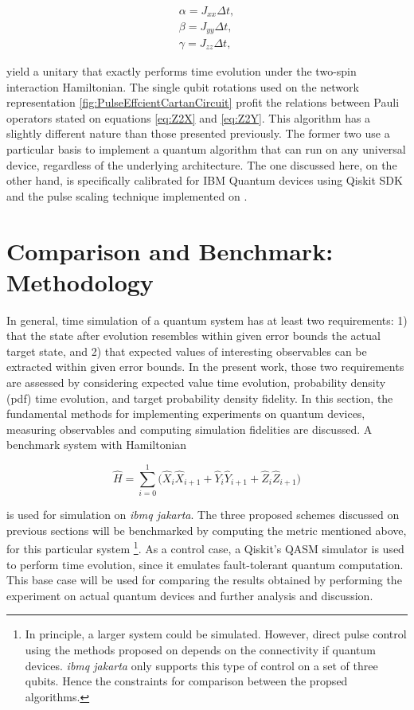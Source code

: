       \begin{gather}
        \alpha = J_{xx} \Delta t, \\
        \beta = J_{yy} \Delta t, \\
        \gamma = J_{zz} \Delta t,
      \end{gather}

      \noindent yield a unitary that exactly performs time evolution under the two-spin interaction Hamiltonian. The single qubit rotations used on the network representation \ref{fig:PulseEffcientCartanCircuit} profit the relations between Pauli operators stated on equations \ref{eq:Z2X} and \ref{eq:Z2Y}. This algorithm has a slightly different nature than those presented previously. The former two use a particular basis to implement a quantum algorithm that can run on any universal device, regardless of the underlying architecture. The one discussed here, on the other hand, is specifically calibrated for IBM Quantum devices using Qiskit SDK and the pulse scaling technique implemented on \cite{RXZPulseEfficient}.

\section{Comparison and Benchmark: Methodology}
\label{sec:Methodology}

  In general, time simulation of a quantum system has at least two requirements: 1) that the state after evolution resembles within given error bounds the actual target state, and 2) that expected values of interesting observables can be extracted within given error bounds. In the present work, those two requirements are assessed by considering expected value time evolution, probability density (pdf) time evolution, and target probability density fidelity. In this section, the fundamental methods for implementing experiments on quantum devices, measuring observables and computing simulation fidelities are discussed. A benchmark system with Hamiltonian

  \begin{equation}
    \hat{H} = \sum_{i=0}^{1}\Bigg(\hat{X}_i\hat{X}_{i+1} + \hat{Y}_i\hat{Y}_{i+1} + \hat{Z}_i\hat{Z}_{i+1} \Bigg)
    \label{eq:BenchmarkHamiltonian}
  \end{equation}

  \noindent is used for simulation on \textit{ibmq jakarta}. The three proposed schemes discussed on previous sections will be benchmarked by computing the metric mentioned above, for this particular system \footnote{In principle, a larger system could be simulated. However, direct pulse control using the methods proposed on \cite{RXZPulseEfficient} depends on the connectivity if quantum devices. \textit{ibmq jakarta} only supports this type of control on a set of three qubits. Hence the constraints for comparison between the propsed algorithms.}. As a control case, a Qiskit's QASM simulator is used to perform time evolution, since it emulates fault-tolerant quantum computation. This base case will be used for comparing the results obtained by performing the experiment on actual quantum devices and further analysis and discussion.

